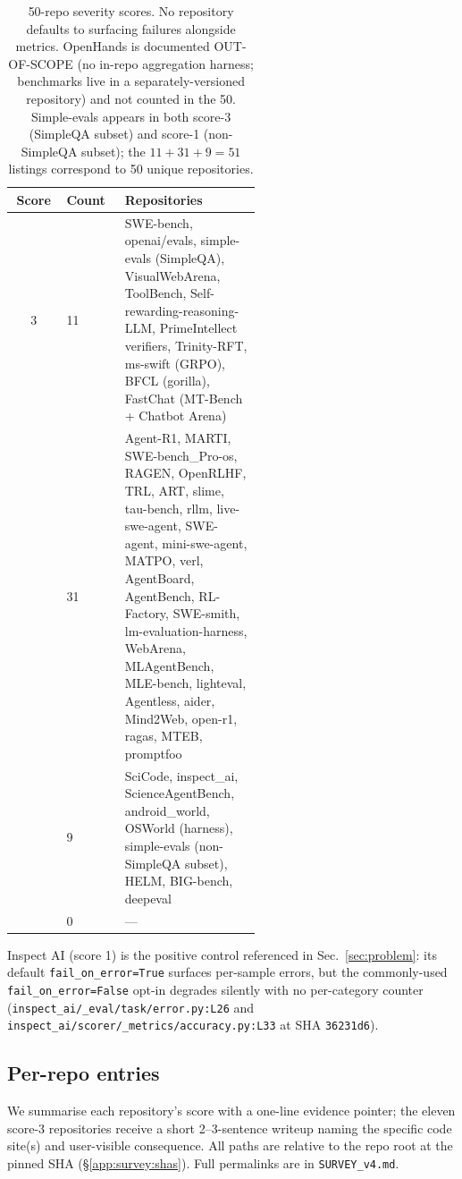 \documentclass{article}
\begin{document}
\begin{table}[h]
\centering
\small
\caption{50-repo severity scores. No repository defaults to
surfacing failures alongside metrics. OpenHands is documented
OUT-OF-SCOPE (no in-repo aggregation harness; benchmarks live
in a separately-versioned repository) and not counted in the
50. Simple-evals appears in both score-3 (SimpleQA subset) and
score-1 (non-SimpleQA subset); the $11{+}31{+}9{=}51$ listings
correspond to 50 unique repositories.}
\label{tab:survey:distribution}
\begin{tabular}{@{}clp{0.55\linewidth}@{}}
\toprule
\textbf{Score} & \textbf{Count} & \textbf{Repositories} \\
\midrule
3 & 11 & SWE-bench, openai/evals, simple-evals (SimpleQA),
VisualWebArena, ToolBench, Self-rewarding-reasoning-LLM,
PrimeIntellect verifiers, Trinity-RFT, ms-swift (GRPO), BFCL
(gorilla), FastChat (MT-Bench + Chatbot Arena) \\
\addlinespace
2 & 31 & Agent-R1, MARTI, SWE-bench\_Pro-os, RAGEN, OpenRLHF,
TRL, ART, slime, tau-bench, rllm, live-swe-agent, SWE-agent,
mini-swe-agent, MATPO, verl, AgentBoard, AgentBench,
RL-Factory, SWE-smith, lm-evaluation-harness, WebArena,
MLAgentBench, MLE-bench, lighteval, Agentless, aider, Mind2Web,
open-r1, ragas, MTEB, promptfoo \\
\addlinespace
1 & 9 & SciCode, inspect\_ai, ScienceAgentBench, android\_world,
OSWorld (harness), simple-evals (non-SimpleQA subset), HELM,
BIG-bench, deepeval \\
\addlinespace
0 & 0 & --- \\
\bottomrule
\end{tabular}
\end{table}

Inspect AI (score 1) is the positive control referenced in
Sec.~\ref{sec:problem}: its default
\texttt{fail\_on\_error=True} surfaces per-sample errors, but
the commonly-used \texttt{fail\_on\_error=False} opt-in
degrades silently with no per-category counter
(\texttt{inspect\_ai/\_eval/task/error.py:L26} and
\texttt{inspect\_ai/scorer/\_metrics/accuracy.py:L33} at SHA
\texttt{36231d6}).

\subsection{Per-repo entries}
\label{app:survey:entries}

We summarise each repository's score with a one-line evidence
pointer; the eleven score-3 repositories receive a short
2--3-sentence writeup naming the specific code site(s) and
user-visible consequence. All paths are relative to the repo
root at the pinned SHA (\S\ref{app:survey:shas}). Full
permalinks are in \texttt{SURVEY\_v4.md}.
\end{document}
